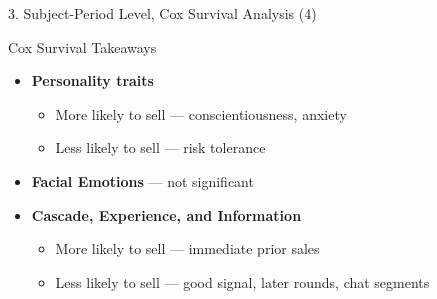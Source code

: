 \documentclass{beamer}
\begin{document}
\begin{frame}{3. Subject-Period Level, Cox Survival Analysis (4)}

\begin{center}
\end{center}
\end{frame}



\begin{frame}{Cox Survival Takeaways}
\begin{itemize}
    \item \textbf{Personality traits} 
    \begin{itemize}
        \item More likely to sell   --- conscientiousness, anxiety
        \item Less likely to sell  --- risk tolerance
    \end{itemize}
\vspace{0.2in}
    \item \textbf{Facial Emotions} --- not significant

\vspace{0.2in}
    \item \textbf{Cascade, Experience, and Information} 
        \begin{itemize}
        \item More likely to sell   --- immediate prior sales
        \item Less likely to sell  --- good signal, later rounds, chat segments
    \end{itemize}
\end{itemize}
\end{frame}
\end{document}

